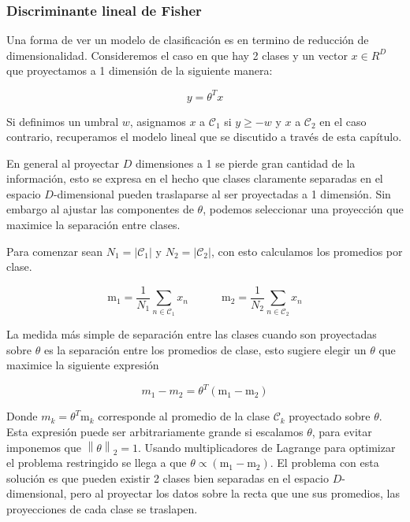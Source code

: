 \subsubsection{Discriminante lineal de Fisher}

Una forma de ver un modelo de clasificación es en termino de reducción de dimensionalidad. Consideremos el caso en que hay 2 clases y un vector $x\in R^D$ que proyectamos a 1 dimensión de la siguiente manera:

\begin{equation}
	y = \theta^Tx
\end{equation}

Si definimos un umbral $w$, asignamos $x$ a $\mathcal{C}_1$ si $y\geq-w$ y $x$ a $\mathcal{C}_2$ en el caso contrario, recuperamos el modelo lineal que se discutido a través de esta capítulo.

En general al proyectar $D$ dimensiones a 1 se pierde gran cantidad de la información, esto se expresa en el hecho que clases claramente separadas en el espacio $D$-dimensional pueden traslaparse al ser proyectadas a 1 dimensión. Sin embargo al ajustar las componentes de $\theta$, podemos seleccionar una proyección que maximice la separación entre clases.

Para comenzar sean $N_1 = |\mathcal{C}_1|$ y $N_2 = |\mathcal{C}_2|$, con esto calculamos los promedios por clase.

\begin{equation}
	\text{m}_1=\frac{1}{N_1}\sum_{n\in\mathcal{C}_1}x_n
	\quad\quad\quad
	\text{m}_2=\frac{1}{N_2}\sum_{n\in\mathcal{C}_2}x_n
\end{equation}

La medida más simple de separación entre las clases cuando son proyectadas sobre $\theta$ es la separación entre los promedios de clase, esto sugiere elegir un $\theta$ que maximice la siguiente expresión

\begin{equation}
	m_1 - m_2 = \theta^T(\text{m}_1-\text{m}_2)
\end{equation}

Donde $m_k= \theta^T\text{m}_k$ corresponde al promedio de la clase $\mathcal{C}_k$ proyectado sobre $\theta$. Esta expresión puede ser arbitrariamente grande si escalamos $\theta$, para evitar imponemos que $\left \| \theta \right \|_2=1$. Usando multiplicadores de Lagrange para optimizar el problema restringido se llega a que $\theta\propto(\text{m}_1-\text{m}_2)$. El problema con esta solución es que pueden existir 2 clases bien separadas en el espacio $D$-dimensional, pero al proyectar los datos sobre la recta que une sus promedios, las proyecciones de cada clase se traslapen.

